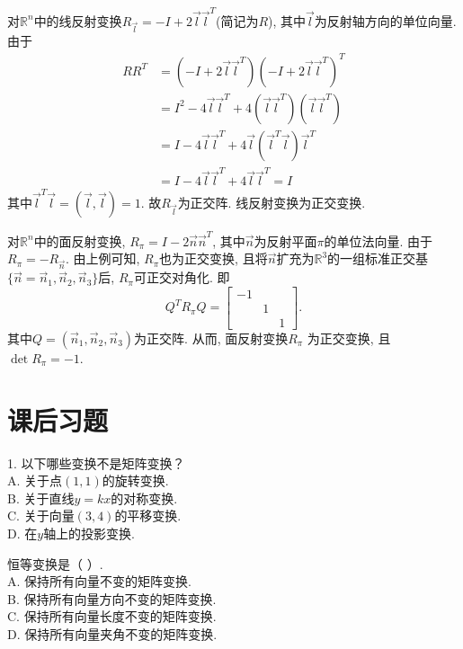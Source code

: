 \begin{eg}
对$\mathbb{R}^n$中的线反射变换$R_{\vec{l}}=-I+2\vec{l}\vec{l}^T$(简记为$R$), 其中$\vec{l}$为反射轴方向的单位向量. 由于
\begin{displaymath}\begin{aligned}
RR^T&=(-I+2\vec{l}\vec{l}^T)(-I+2\vec{l}\vec{l}^T)^T\\
&=I^2-4\vec{l}\vec{l}^T+4(\vec{l}\vec{l}^T)(\vec{l}\vec{l}^T)\\
&=I-4\vec{l}\vec{l}^T+4\vec{l}(\vec{l}^T\vec{l})\vec{l}^T\\
&=I-4\vec{l}\vec{l}^T+4\vec{l}\vec{l}^T=I\end{aligned}\end{displaymath}
其中$\vec{l}^T\vec{l}=(\vec{l},\vec{l})=1$. 故$R_{\vec{l}}$为正交阵. 线反射变换为正交变换.
\end{eg}

\begin{eg}
对$\mathbb{R}^n$中的面反射变换, $R_{\pi}=I-2\vec{n}\vec{n}^T$, 其中$\vec{n}$为反射平面$\pi$的单位法向量. 由于$R_{\pi}=-R_{\vec{n}}$. 由上例可知, $R_{\pi}$也为正交变换, 且将$\vec{n}$扩充为$\mathbb{R}^3$的一组标准正交基$\{\vec{n}=\vec{n}_1,\vec{n}_2,\vec{n}_3\}$后, $R_{\pi}$可正交对角化. 即
$$Q^TR_{\pi}Q=\begin{bmatrix} -1&&\\&1&\\&&1\end{bmatrix}.$$
其中$Q=(\vec{n}_1,\vec{n}_2,\vec{n}_3)$为正交阵. 从而, 面反射变换$R_{\pi}$ 为正交变换, 且$\det R_{\pi}=-1$.
\end{eg}


\section{课后习题}
\begin{ex}\label{8.1}
1. 以下哪些变换不是矩阵变换？\\
A. 关于点$(1,1)$的旋转变换.\\		
B. 关于直线$y=kx$的对称变换.\\
C. 关于向量$(3,4)$的平移变换.\\		
D. 在$y$轴上的投影变换.
\end{ex}

\begin{ex}\label{8.2}
恒等变换是（    ）.\\
A. 保持所有向量不变的矩阵变换.\\
B. 保持所有向量方向不变的矩阵变换.\\
C. 保持所有向量长度不变的矩阵变换.\\
D. 保持所有向量夹角不变的矩阵变换.
\end{ex}

